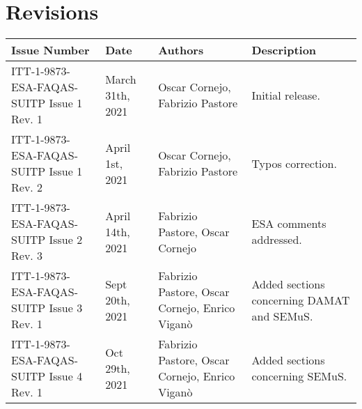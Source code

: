 
\section*{Revisions}
\label{sec:revisions}

\setlength\LTleft{0pt}
\setlength\LTright{0pt}
\scriptsize 
\begin{longtable}{|p{2cm}|p{2cm}|p{2cm}|p{7cm}|@{}}
\label{table:codeoperators} \\
\hline
\textbf{Issue Number}&\textbf{Date}&\textbf{Authors}&\textbf{Description}\\
\hline
ITT-1-9873-ESA-FAQAS-SUITP
Issue 1 Rev. 1&
March 31th, 2021&
Oscar Cornejo, Fabrizio Pastore&
\begin{minipage}{8cm}
Initial release.
\end{minipage}
\\
\hline
ITT-1-9873-ESA-FAQAS-SUITP
Issue 1 Rev. 2&
April 1st, 2021&
Oscar Cornejo, Fabrizio Pastore&
\begin{minipage}{8cm}
Typos correction.
\end{minipage}
\\
\hline
ITT-1-9873-ESA-FAQAS-SUITP
Issue 2 Rev. 3&
April 14th, 2021&
Fabrizio Pastore, Oscar Cornejo&
\begin{minipage}{8cm}
ESA comments addressed.
\end{minipage}
\\
\hline
ITT-1-9873-ESA-FAQAS-SUITP
Issue 3 Rev. 1&
Sept 20th, 2021&
Fabrizio Pastore, Oscar Cornejo, Enrico Viganò&
\begin{minipage}{8cm}
Added sections concerning DAMAT and SEMuS.
\end{minipage}
\\
\hline
ITT-1-9873-ESA-FAQAS-SUITP
Issue 4 Rev. 1&
Oct 29th, 2021&
Fabrizio Pastore, Oscar Cornejo, Enrico Viganò&
\begin{minipage}{8cm}
Added sections concerning SEMuS.
\end{minipage}
\\
\hline



                                                    
\end{longtable}
\normalsize

\clearpage